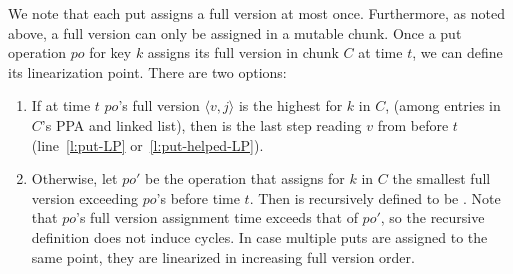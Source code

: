 We note that each put assigns a full version at most once. 
Furthermore, as noted above, a full version can only be assigned in a mutable chunk.
Once a put operation $po$ for key $k$ assigns its full version in chunk $C$ at time $t$, we can define its linearization point. 
There are two options: 
\begin{enumerate}
\item If at time $t$
$po$'s full version $\langle v, j \rangle$ is the highest for $k$ in $C$, (among entries in $C$'s {PPA} and  linked list),
then   is the last step reading $v$ from  before $t$ (line~\ref{l:put-LP} or~\ref{l:put-helped-LP}). 
\item  Otherwise, let $po'$ be the 
 operation that assigns for $k$ in $C$ the smallest full version exceeding $po$'s
before time $t$. Then  is recursively defined to be . Note that 
$po$'s full version assignment time exceeds that of  $po'$, so the recursive definition does not induce cycles. 
In case multiple puts are assigned to the same point, they are linearized in increasing full version order.
\end{enumerate}




